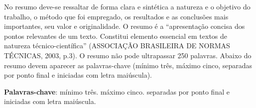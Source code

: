 \begin{resumo}
	
	No resumo deve-se ressaltar de forma clara e sintética a natureza e o objetivo do trabalho, o método que foi empregado, os resultados e as conclusões mais importantes, seu valor e originalidade. O resumo é a “apresentação concisa dos pontos relevantes de um texto. Constitui elemento essencial em textos de natureza técnico-científica” (ASSOCIAÇÃO BRASILEIRA DE NORMAS TÉCNICAS, 2003, p.3). O resumo não pode	ultrapassar 250 palavras. Abaixo do resumo devem aparecer as palavras-chave (mínimo três, máximo cinco, separadas por ponto final e iniciadas com letra maiúscula).
	
	\textbf{Palavras-chave}: mínimo três. máximo cinco. separadas por ponto final e iniciadas com letra maiúscula.
\end{resumo}